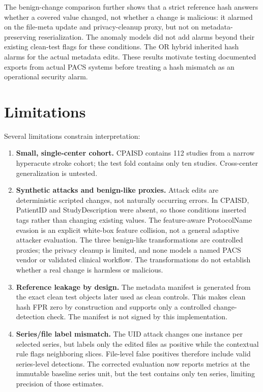 \documentclass[journal]{IEEEtran}
\begin{document}
  The benign-change comparison further shows that a strict reference hash answers whether a covered value changed, not whether a change is malicious: it alarmed on the file-meta update and privacy-cleanup proxy, but not on metadata-preserving reserialization. The anomaly models did not add alarms beyond their existing clean-test flags for these conditions. The OR hybrid inherited hash alarms for the actual metadata edits. These results motivate testing documented exports from actual PACS systems before treating a hash mismatch as an operational security alarm.
  
  \section{Limitations}\label{sec:limitations}
  Several limitations constrain interpretation:
  \begin{enumerate}[leftmargin=*]
    \item \textbf{Small, single-center cohort.} CPAISD contains 112 studies from a narrow hyperacute stroke cohort; the test fold contains only ten studies. Cross-center generalization is untested.
    \item \textbf{Synthetic attacks and benign-like proxies.} Attack edits are deterministic scripted changes, not naturally occurring errors. In CPAISD, PatientID and StudyDescription were absent, so those conditions inserted tags rather than changing existing values. The feature-aware ProtocolName evasion is an explicit white-box feature collision, not a general adaptive attacker evaluation. The three benign-like transformations are controlled proxies; the privacy cleanup is limited, and none models a named PACS vendor or validated clinical workflow. The transformations do not establish whether a real change is harmless or malicious.
    \item \textbf{Reference leakage by design.} The metadata manifest is generated from the exact clean test objects later used as clean controls. This makes clean hash FPR zero by construction and supports only a controlled change-detection check. The manifest is not signed by this implementation.
    \item \textbf{Series/file label mismatch.} The UID attack changes one instance per selected series, but labels only the edited files as positive while the contextual rule flags neighboring slices. File-level false positives therefore include valid series-level detections. The corrected evaluation now reports metrics at the immutable baseline series unit, but the test contains only ten series, limiting precision of those estimates.

\end{enumerate}
\end{document}
